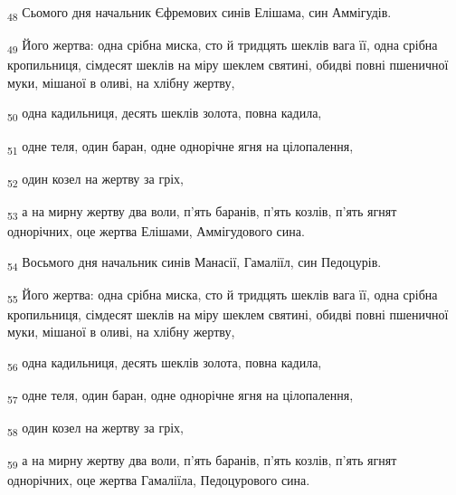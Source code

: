 \begin{tcolorbox}
\textsubscript{48} Сьомого дня начальник Єфремових синів Елішама, син Аммігудів.
\end{tcolorbox}
\begin{tcolorbox}
\textsubscript{49} Його жертва: одна срібна миска, сто й тридцять шеклів вага її, одна срібна кропильниця, сімдесят шеклів на міру шеклем святині, обидві повні пшеничної муки, мішаної в оливі, на хлібну жертву,
\end{tcolorbox}
\begin{tcolorbox}
\textsubscript{50} одна кадильниця, десять шеклів золота, повна кадила,
\end{tcolorbox}
\begin{tcolorbox}
\textsubscript{51} одне теля, один баран, одне однорічне ягня на цілопалення,
\end{tcolorbox}
\begin{tcolorbox}
\textsubscript{52} один козел на жертву за гріх,
\end{tcolorbox}
\begin{tcolorbox}
\textsubscript{53} а на мирну жертву два воли, п'ять баранів, п'ять козлів, п'ять ягнят однорічних, оце жертва Елішами, Аммігудового сина.
\end{tcolorbox}
\begin{tcolorbox}
\textsubscript{54} Восьмого дня начальник синів Манасії, Гамаліїл, син Педоцурів.
\end{tcolorbox}
\begin{tcolorbox}
\textsubscript{55} Його жертва: одна срібна миска, сто й тридцять шеклів вага її, одна срібна кропильниця, сімдесят шеклів на міру шеклем святині, обидві повні пшеничної муки, мішаної в оливі, на хлібну жертву,
\end{tcolorbox}
\begin{tcolorbox}
\textsubscript{56} одна кадильниця, десять шеклів золота, повна кадила,
\end{tcolorbox}
\begin{tcolorbox}
\textsubscript{57} одне теля, один баран, одне однорічне ягня на цілопалення,
\end{tcolorbox}
\begin{tcolorbox}
\textsubscript{58} один козел на жертву за гріх,
\end{tcolorbox}
\begin{tcolorbox}
\textsubscript{59} а на мирну жертву два воли, п'ять баранів, п'ять козлів, п'ять ягнят однорічних, оце жертва Гамаліїла, Педоцурового сина.
\end{tcolorbox}
